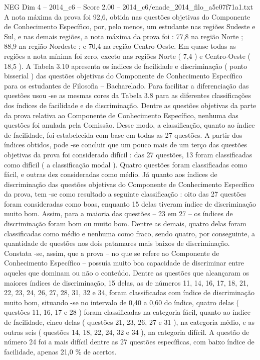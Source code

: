 \begin{textsample}{NEG Dim 4 – 2014\_c6 – Score 2.00 – 2014\_c6/enade\_2014\_filo\_a5e07f71a1.txt}
A nota máxima da prova foi 92,6, obtida nas questões objetivas do Componente de Conhecimento Específico, por, pelo menos, um estudante nas regiões Sudeste e Sul, e nas demais regiões, a nota máxima da prova foi : 77,8 na região Norte ; 88,9 na região Nordeste ; e 70,4 na região Centro-Oeste.
Em quase todas as regiões a nota mínima foi zero, exceto nas regiões Norte ( 7,4 ) e Centro-Oeste ( 18,5 ).
A Tabela 3.10 apresenta os índices de facilidade e discriminação ( ponto bisserial ) das questões objetivas do Componente de Conhecimento Específico para os estudantes de Filosofia – Bacharelado.
Para facilitar a diferenciação das questões usou -se as mesmas cores da Tabela 3.8 para as diferentes classificações dos índices de facilidade e de discriminação.
Dentre as questões objetivas da parte da prova relativa ao Componente de Conhecimento Específico, nenhuma das questões foi anulada pela Comissão.
Desse modo, a classificação, quanto ao índice de facilidade, foi estabelecida com base em todas as 27 questões.
A partir dos índices obtidos, pode -se concluir que um pouco mais de um terço das questões objetivas da prova foi considerado difícil : das 27 questões, 13 foram classificadas como difícil ( a classificação modal ).
Quatro questões foram classificadas como fácil, e outras dez consideradas como médio.
Já quanto aos índices de discriminação das questões objetivas do Componente de Conhecimento Específico da prova, tem -se como resultado a seguinte classificação : oito das 27 questões foram consideradas como boas, enquanto 15 delas tiveram índice de discriminação muito bom.
Assim, para a maioria das questões – 23 em 27 – os índices de discriminação foram bom ou muito bom.
Dentre as demais, quatro delas foram classificadas como médio e nenhuma como fraco, sendo quatro, por conseguinte, a quantidade de questões nos dois patamares mais baixos de discriminação.
Constata -se, assim, que a prova – no que se refere ao Componente de Conhecimento Específico – possuía muito boa capacidade de discriminar entre aqueles que dominam ou não o conteúdo.
Dentre as questões que alcançaram os maiores índices de discriminação, 15 delas, as de números 11, 14, 16, 17, 18, 21, 22, 23, 24, 26, 27, 28, 31, 32 e 34, foram classificadas com índice de discriminação muito bom, situando -se no intervalo de 0,40 a 0,60 do índice, quatro delas ( questões 11, 16, 17 e 28 ) foram classificadas na categoria fácil, quanto ao índice de facilidade, cinco delas ( questões 21, 23, 26, 27 e 31 ), na categoria médio, e as outras seis ( questões 14, 18, 22, 24, 32 e 34 ), na categoria difícil.
A questão de número 24 foi a mais difícil dentre as 27 questões específicas, com baixo índice de facilidade, apenas 21,0 \% de acertos.

\end{textsample}
